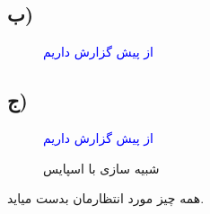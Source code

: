 \subsection{ب)}
\begin{figure}[h]
    \centering
    \caption{\textcolor{blue}{از پیش گزارش داریم}}
\end{figure}
\subsection{ج)}
\begin{figure}[!h]
    \centering
    \caption{\textcolor{blue}{از پیش گزارش داریم}}
\end{figure}
\begin{figure}[!h]
    \centering
    \caption{شبیه سازی با اسپایس}
\end{figure}
همه چیز مورد انتظارمان بدست میاید.
\pagebreak
